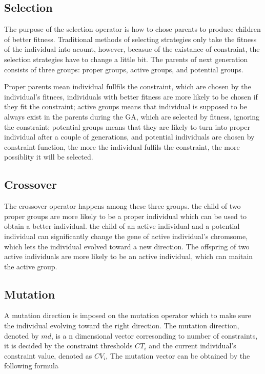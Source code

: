 \documentclass{article}
\begin{document}
\subsection{Selection}
The purpose of the selection operator is how to chose parents to produce children of better
fitness. Traditional methods of selecting strategies only take the fitness of the individual into
acount, however, becasue of the existance of constraint, the selection strategies have to change a
little bit. The parents of next generation consists of three groups: proper groups, active groups,
and potential groups. 

Proper parents mean individual fullfils the constraint, which are chosen by the individual's
fitnees, individuals with better fitness are more likely to be chosen if they fit the constraint;
active groups means that individual is supposed to be always exist in the parents during the GA,
which are selected by fitness, ignoring the constraint; potential groups means that they are likely
to turn into proper individual after a couple of generations, and potential individuals are chosen
by constraint function, the more the individual fulfils the constraint, the more possiblity it will
be selected.


	
\subsection{Crossover}
The crossover operator happens among these three groups. the child of two proper groups are more
likely to be a proper individual which can be used to obtain a better individual. the child of an
active individual and a potential individual can significantly change the gene of active
individual's chromsome, which lets the individual evolved toward a new direction.  The offspring of
two active individuals are more likely to be an active individual, which can maitain the active
group.
\subsection{Mutation}
A mutation direction is imposed on the mutation operator which to make sure the individual evolving
toward the right direction. The mutation direction, denoted by $md$, is a n dimensional vector corresonding to
number of constraints, it is decided by the constraint thresholds $CT_i$ and the current individual's
constraint value, denoted as $CV_i$,  The mutation vector can be obtained by the following formula
\end{document}

